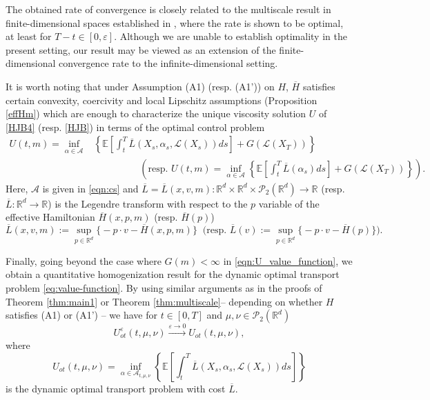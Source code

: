 \documentclass[reqno,11pt]{amsart}
\numberwithin{equation}{section}
\newcommand{\be}{\begin{equation}}
\newcommand{\ee}{\end{equation}}
\newcommand{\R}{\mathbb{R}} %
\newcommand{\e}{\varepsilon}
\newcommand{\nd}{\noindent}
\renewcommand{\bar}{\overline}
\begin{document}
\nd
The obtained rate of convergence is closely related to the multiscale result in finite-dimensional spaces established in \cite[Theorem 1.1]{HanJang2023}, where the rate is shown to be optimal, at least for $T-t \in [0,\varepsilon]$. Although we are unable to establish optimality in the present setting, our result may be viewed as an extension of the finite-dimensional convergence rate to the infinite-dimensional setting.
\vspace{1mm}

\nd
It is worth noting that under Assumption (A1) (resp. (A1')) on $H$, $\overline{H}$ satisfies certain convexity, coercivity and local Lipschitz assumptions (Proposition \ref{effHm}) which are enough to characterize the unique viscosity solution $U$ of \eqref{HJB4} (resp. \eqref{HJB}) in terms of the optimal control problem
\begin{align}
U(t,m)=\inf_{\alpha\in\mathcal{A}}&\left\{\mathbb E\left[\int_t^T\overline{L}(X_s,\alpha_s,\mathcal{L}(X_s))ds\right]+G(\mathcal{L}(X_T))\right\}\label{formula}\\
&\hspace{2cm}\left(\text{resp. } U(t,m)=\inf_{\alpha\in\mathcal{A}}\left\{\mathbb{E}\left[\int_t^T\overline{L}(\alpha_s)ds\right]+G(\mathcal{L}(X_T))\right\}\right).\nonumber
\end{align}
Here, $\mathcal{A}$ is given in \eqref{eqn:cs} and $\overline{L}=\overline{L}(x,v,m)\colon\R^d\times\R^d\times\mathcal{P}_2(\R^d)\to \R$ (resp. $\overline{L}\colon\R^d\to \R$) is the Legendre transform with respect to the $p$ variable of the effective Hamiltonian $\overline{H}(x,p,m)$ (resp. $\overline{H}(p)$)
\be\label{effLagr}
\bar{L}(x,v,m) := \sup_{p \in \R^d} \big\{ -p \cdot v - \bar{H}(x,p,m) \big\}\;\;\big(\text{resp. } \bar{L}(v) := \sup_{p \in \R^d} \big\{ -p \cdot v - \bar{H}(p) \big\}   \big).
\ee
\vspace{2mm}

\nd
Finally, going beyond the case where $G(m)<\infty$ in \eqref{eqn:U_value_function}, we obtain a quantitative homogenization result for the dynamic optimal transport problem \eqref{eq:value-function}. By using similar arguments as in the proofs of Theorem \ref{thm:main1} or Theorem \ref{thm:multiscale}-- depending on whether $H$ satisfies (A1) or (A1')
-- we have for $t\in [0,T]$ and $\mu,\nu\in\mathcal{P}_2(\R^d)$
$$U^\e_{ot}(t,\mu,\nu)\xrightarrow{\e\to 0}U_{ot}(t,\mu,\nu),$$
where
\be\label{DOTlimit}
U_{ot}(t,\mu,\nu)=\inf_{\alpha\in \mathcal{A}_{t,\mu,\nu}}\left\{\mathbb{E}\left[\int_t^T\overline{L}(X_s,\alpha_s,\mathcal{L}(X_s))ds   \right]\right\}
\ee
is the dynamic optimal transport problem with cost $\overline{L}$.
\end{document}
